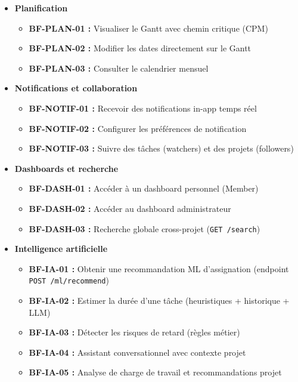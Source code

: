 \begin{itemize}
  \item \textbf{Planification}
  \begin{itemize}
    \item \textbf{BF-PLAN-01 :} Visualiser le Gantt avec chemin critique (CPM)
    \item \textbf{BF-PLAN-02 :} Modifier les dates directement sur le Gantt
    \item \textbf{BF-PLAN-03 :} Consulter le calendrier mensuel
  \end{itemize}

  \item \textbf{Notifications et collaboration}
  \begin{itemize}
    \item \textbf{BF-NOTIF-01 :} Recevoir des notifications in-app temps réel
    \item \textbf{BF-NOTIF-02 :} Configurer les préférences de notification
    \item \textbf{BF-NOTIF-03 :} Suivre des tâches (watchers) et des projets (followers)
  \end{itemize}

  \item \textbf{Dashboards et recherche}
  \begin{itemize}
    \item \textbf{BF-DASH-01 :} Accéder à un dashboard personnel (Member)
    \item \textbf{BF-DASH-02 :} Accéder au dashboard administrateur
    \item \textbf{BF-DASH-03 :} Recherche globale cross-projet (\texttt{GET /search})
  \end{itemize}

  \item \textbf{Intelligence artificielle}
  \begin{itemize}
    \item \textbf{BF-IA-01 :} Obtenir une recommandation ML d'assignation
          (endpoint \texttt{POST /ml/recommend})
    \item \textbf{BF-IA-02 :} Estimer la durée d'une tâche
          (heuristiques + historique + LLM)
    \item \textbf{BF-IA-03 :} Détecter les risques de retard (règles métier)
    \item \textbf{BF-IA-04 :} Assistant conversationnel avec contexte projet
    \item \textbf{BF-IA-05 :} Analyse de charge de travail et recommandations projet
  \end{itemize}


\end{itemize}
